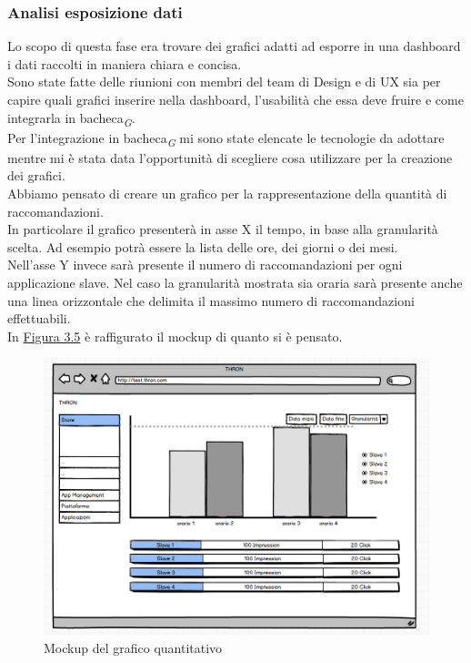 \documentclass[a4paper, 12pt, twoside, openright]{book}
\newcommand{\gloss}[1]{#1\textsubscript{\textit{\tiny{G}}}}
\begin{document}
\subsubsection{Analisi esposizione dati}
Lo scopo di questa fase era trovare dei grafici adatti ad esporre in una dashboard i dati raccolti in maniera chiara e concisa.\\
Sono state fatte delle riunioni con membri del team di Design e di UX sia per capire quali grafici inserire nella dashboard, l'usabilità che essa deve fruire e come integrarla in \gloss{bacheca}.\\
Per l'integrazione in \gloss{bacheca} mi sono state elencate le tecnologie da adottare mentre mi è stata data l'opportunità di scegliere cosa utilizzare per la creazione dei grafici.\\
Abbiamo pensato di creare un grafico per la rappresentazione della quantità di raccomandazioni.\\
In particolare il grafico presenterà in asse X il tempo, in base alla granularità scelta. Ad esempio potrà essere la lista delle ore, dei giorni o dei mesi.\\
Nell'asse Y invece sarà presente il numero di raccomandazioni per ogni applicazione slave. Nel caso la granularità mostrata sia oraria sarà presente anche una linea orizzontale che delimita il massimo numero di raccomandazioni effettuabili.\\
In \hyperref[grafico-quantitativo-mockup]{Figura 3.5} è raffigurato il mockup di quanto si è pensato.
\begin{figure}[H]
	\centering
	\label{grafico-quantitativo-mockup}	\includegraphics[width=1.0\textwidth]{images/grafico-quantitativo-mockup.jpg}
	\caption{Mockup del grafico quantitativo}
\end{figure} 
\end{document}
